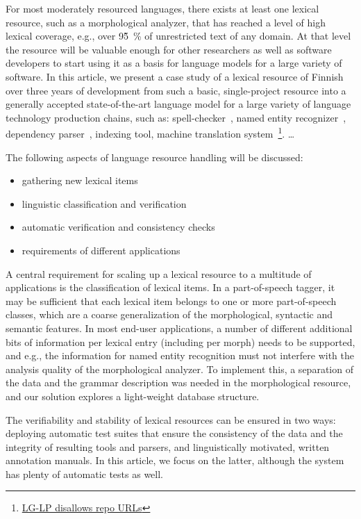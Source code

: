 \documentclass[11pt]{article}
\begin{document}
For most moderately resourced languages, there exists at least one lexical
resource, such as a morphological analyzer, that has reached a level of high
lexical coverage, e.g., over 95̃~\% of unrestricted text of any domain.  At that
level the resource will be valuable enough for other researchers as well as
software developers to start using it as a basis for language models for a
large variety of software. In this article, we present a case study of a
lexical resource of Finnish over three years of development from such a basic,
single-project resource into a generally accepted state-of-the-art language
model for a large variety of language technology production chains, such as:
spell-checker~\cite{pirinen2014weighted}, named entity
recognizer~\cite{linden2013hfst}, dependency parser~\cite{bohnet2013joint},
indexing tool, machine translation system~\footnote{\url{LG-LP disallows repo
URLs}}.  \ldots

The following aspects of language resource handling will be discussed:
\begin{itemize}
    \item gathering new lexical items
    \item linguistic classification and verification
    \item automatic verification and consistency checks
    \item requirements of different applications
\end{itemize}

A central requirement for scaling up a lexical resource to a multitude of
applications is the classification of lexical items. In a part-of-speech
tagger, it may be sufficient that each lexical item belongs to one or more
part-of-speech classes, which are a coarse generalization of the morphological,
syntactic and semantic features. In most end-user applications, a number of
different additional bits of information per lexical entry (including per
morph) needs to be supported, and e.g., the information for named entity
recognition must not interfere with the analysis quality of the morphological
analyzer. To implement this, a separation of the data and the grammar
description was needed in the morphological resource, and our solution explores
a light-weight database structure.

The verifiability and stability of lexical resources can be ensured in two
ways: deploying automatic test suites that ensure the consistency of the data
and the integrity of resulting tools and parsers, and linguistically motivated,
written annotation manuals. In this article, we focus on the latter, although
the system has plenty of automatic tests as well.
\end{document}
